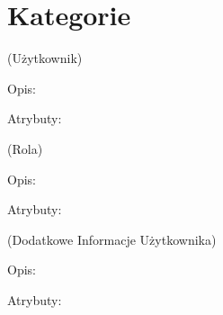 \section{Kategorie}\label{sec:categories}

\begin{enumerate}[label={\textbf{KAT/\protect\threedigits{\theenumi}}}, wide, labelwidth=!, labelindent=0pt, labelsep=0pt, series=reqs]
    \setlength\itemsep{1em}
     \label{kat:User} (Użytkownik)

    Opis: \lipsum[1]
    \par
    Atrybuty:
    \begin{itemize}[series=atr]
         \label{kat:User:id}
         \label{kat:User:login}
         \label{kat:User:passwordHash}
         \label{kat:User:firstName}
         \label{kat:User:lastName}
         \label{kat:User:email}
         \label{kat:User:image}
         \label{kat:User:activated}
         \label{kat:User:langKey}
         \label{kat:User:activationKey}
         \label{kat:User:resetKey}
         \label{kat:User:createdDate}
         \label{kat:User:resetDate}
         \label{kat:User:lastModifiedDate}
    \end{itemize}

     \label{kat:Authority} (Rola)

    Opis: \lipsum[1]
    \par
    Atrybuty:
    \begin{itemize}[series=atr]
         \label{kat:Authority:name}
    \end{itemize}

     \label{kat:UserExtraInfo} (Dodatkowe Informacje Użytkownika)

    Opis: \lipsum[1]
    \par
    Atrybuty:
    \begin{itemize}[series=atr]
         \label{kat:UserExtraInfo:id}
         \label{kat:UserExtraInfo:gender}
         \label{kat:UserExtraInfo:dateOfBirth}
         \label{kat:UserExtraInfo:phoneNumber}
         \label{kat:UserExtraInfo:streetAddress}
         \label{kat:UserExtraInfo:postalCode}
         \label{kat:UserExtraInfo:city}
         \label{kat:UserExtraInfo:country}
         \label{kat:UserExtraInfo:personalDescription}
    \end{itemize}


\end{enumerate}
